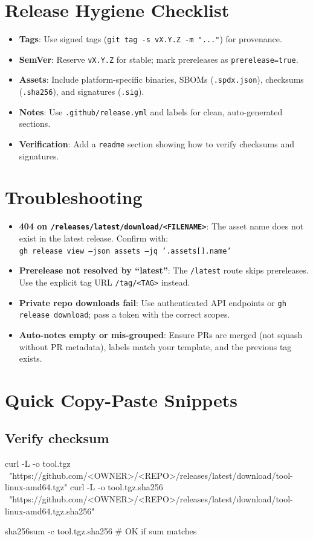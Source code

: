 \documentclass[11pt]{article}
\newcommand{\key}[1]{\texttt{#1}}
\newcommand{\file}[1]{\texttt{#1}}
\begin{document}
\section{Release Hygiene Checklist}
\begin{itemize}
  \item \textbf{Tags}: Use signed tags (\file{git tag -s vX.Y.Z -m "..."}) for provenance.
  \item \textbf{SemVer}: Reserve \file{vX.Y.Z} for stable; mark prereleases as \key{prerelease=true}.
  \item \textbf{Assets}: Include platform-specific binaries, SBOMs (\file{.spdx.json}), checksums (\file{.sha256}), and signatures (\file{.sig}).
  \item \textbf{Notes}: Use \file{.github/release.yml} and labels for clean, auto-generated sections.
  \item \textbf{Verification}: Add a \file{readme} section showing how to verify checksums and signatures.
\end{itemize}

\section{Troubleshooting}
\begin{itemize}
  \item \textbf{404 on \file{/releases/latest/download/<FILENAME>}}: The asset name does not exist in the latest release. Confirm with: \\
  \file{gh release view --json assets --jq '.assets[].name'}
  \item \textbf{Prerelease not resolved by ``latest''}: The \file{/latest} route skips prereleases. Use the explicit tag URL \file{/tag/<TAG>} instead.
  \item \textbf{Private repo downloads fail}: Use authenticated API endpoints or \file{gh release download}; pass a token with the correct scopes.
  \item \textbf{Auto-notes empty or mis-grouped}: Ensure PRs are merged (not squash without PR metadata), labels match your template, and the previous tag exists.
\end{itemize}

\section{Quick Copy-Paste Snippets}
\subsection*{Verify checksum}
\begin{bashcode}
curl -L -o tool.tgz \
  "https://github.com/<OWNER>/<REPO>/releases/latest/download/tool-linux-amd64.tgz"
curl -L -o tool.tgz.sha256 \
  "https://github.com/<OWNER>/<REPO>/releases/latest/download/tool-linux-amd64.tgz.sha256"

sha256sum -c tool.tgz.sha256   # OK if sum matches
\end{bashcode}
\end{document}
